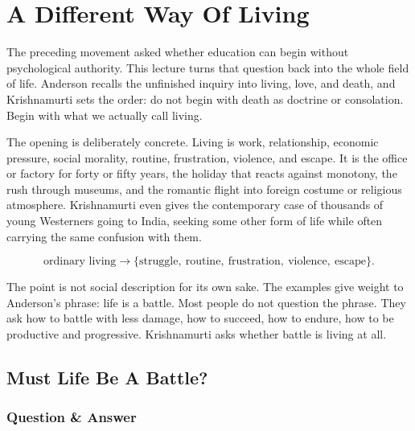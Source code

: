 \documentclass[11pt,oneside]{book}
\begin{document}

\chapter{A Different Way Of Living}

The preceding movement asked whether education can begin without psychological authority. This lecture turns that question back into the whole field of life. Anderson recalls the unfinished inquiry into living, love, and death, and Krishnamurti sets the order: do not begin with death as doctrine or consolation. Begin with what we actually call living.

The opening is deliberately concrete. Living is work, relationship, economic pressure, social morality, routine, frustration, violence, and escape. It is the office or factory for forty or fifty years, the holiday that reacts against monotony, the rush through museums, and the romantic flight into foreign costume or religious atmosphere. Krishnamurti even gives the contemporary case of thousands of young Westerners going to India, seeking some other form of life while often carrying the same confusion with them.

\begin{equation}
\text{ordinary living}
\longrightarrow
\{\text{struggle},\ \text{routine},\ \text{frustration},\ \text{violence},\ \text{escape}\}.
\end{equation}

The point is not social description for its own sake. The examples give weight to Anderson's phrase: life is a battle. Most people do not question the phrase. They ask how to battle with less damage, how to succeed, how to endure, how to be productive and progressive. Krishnamurti asks whether battle is living at all.

\section{Must Life Be A Battle?}

\subsection{Question \& Answer}
\end{document}
